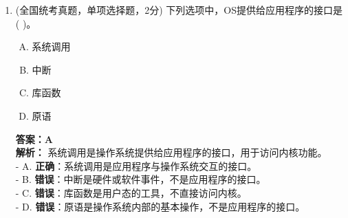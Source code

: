 \documentclass[lang=cn,newtx,10pt,scheme=chinese]{../../elegantbook}
\begin{document}
\begin{enumerate}
\item (全国统考真题，单项选择题，2分) 下列选项中，OS提供给应用程序的接口是 (    )。
    \begin{enumerate}[A.]
        \item 系统调用
        \item 中断
        \item 库函数
        \item 原语
    \end{enumerate}
    \textbf{答案：A}\\
    \textbf{解析：} 系统调用是操作系统提供给应用程序的接口，用于访问内核功能。\\
    - A. \textbf{正确}：系统调用是应用程序与操作系统交互的接口。\\
    - B. \textbf{错误}：中断是硬件或软件事件，不是应用程序的接口。\\
    - C. \textbf{错误}：库函数是用户态的工具，不直接访问内核。\\
    - D. \textbf{错误}：原语是操作系统内部的基本操作，不是应用程序的接口。\\


\end{enumerate}
\end{document}
